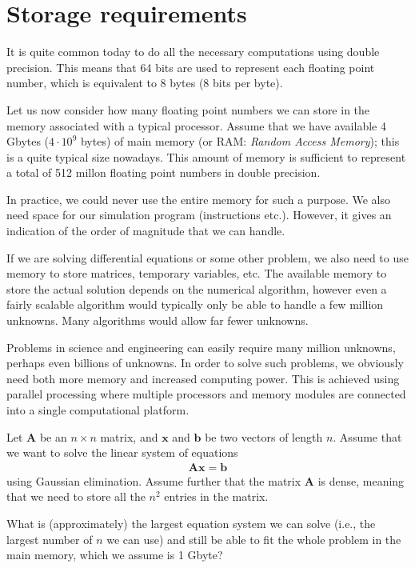 \section{Storage requirements}

It is quite common today to do all the necessary computations using double
precision. This means that 64 bits are used to represent each floating point
number, which is equivalent to 8 bytes (8 bits per byte).

Let us now consider how many floating point numbers we can store in the memory
associated with a typical processor. Assume that we have available 4 Gbytes
($4\cdot 10^9$ bytes) of main memory (or RAM: \emph{Random Access Memory}); this
is a quite typical size nowadays. This amount of memory is sufficient to
represent a total of 512 millon floating point numbers in double precision.

In practice, we could never use the entire memory for such a purpose. We also
need space for our simulation program (instructions etc.). However, it gives an
indication of the order of magnitude that we can handle.

If we are solving differential equations or some other problem, we also need to
use memory to store matrices, temporary variables, etc. The available memory to
store the actual solution depends on the numerical algorithm, however even a
fairly scalable algorithm would typically only be able to handle a few million
unknowns. Many algorithms would allow far fewer unknowns.

Problems in science and engineering can easily require many million unknowns,
perhaps even billions of unknowns. In order to solve such problems, we obviously
need both more memory and increased computing power. This is achieved using
parallel processing where multiple processors and memory modules are connected
into a single computational platform.

\begin{ex}
  Let $\bm A$ be an $n\times n$ matrix, and $\bm x$ and $\bm b$ be two vectors
  of length $n$. Assume that we want to solve the linear system of equations
  \begin{align*}
    \bm A \bm x = \bm b
  \end{align*}
  using Gaussian elimination. Assume further that the matrix $\bm A$ is dense,
  meaning that we need to store all the $n^2$ entries in the matrix.

  What is (approximately) the largest equation system we can solve (i.e., the
  largest number of $n$ we can use) and still be able to fit the whole problem
  in the main memory, which we assume is 1 Gbyte?
\end{ex}

